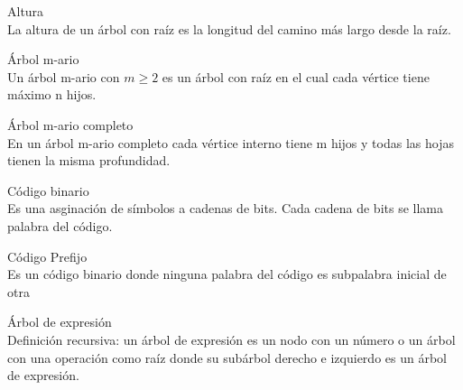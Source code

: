 \documentclass{article}
\begin{document}
\begin{defn}
Altura \\ La altura de un árbol con raíz es la longitud del camino más largo desde la raíz.
\end{defn}

\begin{defn}
Árbol m-ario \\ Un árbol m-ario con $m\geq2$ es un árbol con raíz en el cual cada vértice tiene máximo n hijos. 
\end{defn}

\begin{defn}
Árbol m-ario completo \\ En un árbol m-ario completo cada vértice interno tiene m hijos y todas las hojas tienen la misma profundidad.
\end{defn}

\begin{defn}
Código binario \\ Es una asginación de símbolos a cadenas de bits. Cada cadena de bits se llama palabra del código.
\end{defn}
\begin{defn}
Código Prefijo \\ Es un código binario donde ninguna palabra del código es subpalabra inicial de otra
\end{defn}
\begin{defn}
Árbol de expresión \\Definición recursiva: un árbol de expresión es un nodo con un número o un árbol con una operación como raíz donde su subárbol derecho e izquierdo es un árbol de expresión.
\end{defn}
\end{document}
